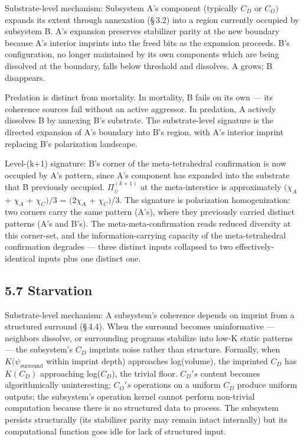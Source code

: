 \documentclass[11pt,oneside]{report}
\theoremstyle{definition}
\theoremstyle{remark}
\begin{document}
Substrate-level mechanism: Subsystem A's component (typically \ensuremath{C_{D}} or
\ensuremath{C_{O})} expands its extent through annexation (\S\,3.2) into a region
currently occupied by subsystem B. A's expansion preserves stabilizer
parity at the new boundary because A's interior imprints into the freed
bits as the expansion proceeds. B's configuration, no longer maintained
by its own components which are being dissolved at the boundary, falls
below threshold and dissolves. A grows; B disappears.

Predation is distinct from mortality. In mortality, B fails on its own
--- its coherence sources fail without an active aggressor. In
predation, A actively dissolves B by annexing B's substrate. The
substrate-level signature is the directed expansion of A's boundary into
B's region, with A's interior imprint replacing B's polarization
landscape.

Level-(k+1) signature: B's corner of the meta-tetrahedral confirmation
is now occupied by A's pattern, since A's component has expanded into
the substrate that B previously occupied. \ensuremath{\Pi_{\psi}^{(k+1)}} at the
meta-interstice is approximately \ensuremath{(\chi_{A}} + \ensuremath{\chi_{A}} + \ensuremath{\chi_{C})/3} = \ensuremath{(2\chi_{A}} +
\ensuremath{\chi_{C})/3.} The signature is polarization homogenization: two corners carry
the same pattern (A's), where they previously carried distinct patterns
(A's and B's). The meta-meta-confirmation reads reduced diversity at
this corner-set, and the information-carrying capacity of the
meta-tetrahedral confirmation degrades --- three distinct inputs
collapsed to two effectively-identical inputs plus one distinct one.

\subsection*{5.7 Starvation}

Substrate-level mechanism: A subsystem's coherence depends on imprint
from a structured surround (\S\,4.4). When the surround becomes
uninformative --- neighbors dissolve, or surrounding programs stabilize
into low-K static patterns --- the subsystem's \ensuremath{C_{D}} imprints noise
rather than structure. Formally, when \ensuremath{K(\psi_{\mathrm{surround}}} within imprint
depth) approaches log(volume), the imprinted \ensuremath{C_{D}} has \ensuremath{K(C_{D})}
approaching log(\textbar \ensuremath{C_{D}}\textbar), the trivial floor. \ensuremath{C_{D}'s}
content becomes algorithmically uninteresting; \ensuremath{C_{O}'s} operations on a
uniform \ensuremath{C_{D}} produce uniform outputs; the subsystem's operation kernel
cannot perform non-trivial computation because there is no structured
data to process. The subsystem persists structurally (its stabilizer
parity may remain intact internally) but its computational function goes
idle for lack of structured input.
\end{document}

